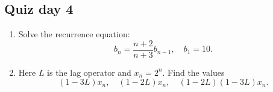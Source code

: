 \documentclass[12pt]{article}
\begin{document}


\subsection*{Quiz day 4}

\begin{enumerate}
    \item Solve the recurrence equation:
    \[
    b_n = \frac{n + 2}{n + 3} b_{n-1}, \quad b_1 = 10.
    \]
    \item Here $L$ is the lag operator and $x_n = 2^n$. 
    Find the values
    \[
    (1 - 3L) x_n, \quad (1 - 2L)x_n, \quad (1-2L)(1 - 3L)x_n.
    \]
\end{enumerate}
\end{document}
